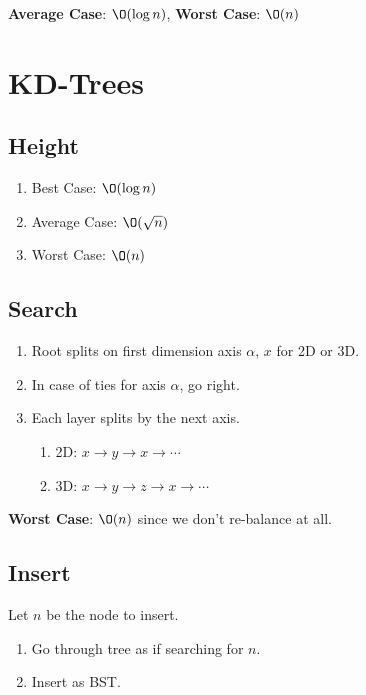 \documentclass[12pt, letterpaper]{article}
\begin{document}
\begin{multicols*}{3}
        {\bf Average Case}: $\O(\log n)$, {\bf Worst Case}: $\O(n)$


        
        \section{KD-Trees}

        \subsection{Height}
        \begin{enumerate}
            \item Best Case: $\O(\log n)$
            \item Average Case: $\O(\sqrt n)$
            \item Worst Case: $\O(n)$
        \end{enumerate}

        \subsection{Search}
        \begin{enumerate}
            \item Root splits on first dimension axis $\alpha$, $x$ for 2D or 3D.
            \item In case of ties for axis $\alpha$, go right.
            \item Each layer splits by the next axis.
            \begin{enumerate}[label=\roman*.]
                \item 2D: $x \to y \to x \to \cdots$
                \item 3D: $x \to y \to z \to x \to \cdots$
            \end{enumerate}
        \end{enumerate}

        {\bf Worst Case}: $\O(n)$ since we don't re-balance at all.

        \subsection{Insert}
        Let $n$ be the node to insert.
        \begin{enumerate}
            \item Go through tree as if searching for $n$.
            \item Insert as BST.
        \end{enumerate}


\end{multicols*}
\end{document}
